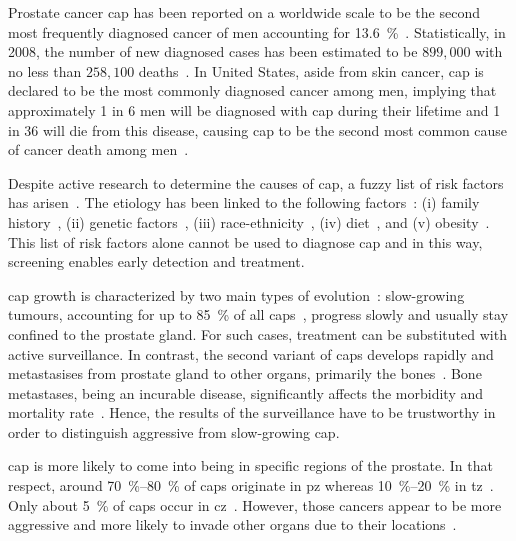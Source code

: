 Prostate cancer \ac{cap} has been reported on a worldwide scale to be the
second most frequently diagnosed cancer of men accounting for
\SI{13.6}{\percent}~\cite{Ferlay2010}.
Statistically, in 2008, the number of new diagnosed cases has been estimated to
be $899,000$ with no less than $258,100$ deaths~\cite{Ferlay2010}.
In United States, aside from skin cancer, \ac{cap} is declared to be the most
commonly diagnosed cancer among men, implying that approximately 1 in 6 men
will be diagnosed with \ac{cap} during their lifetime and 1 in 36 will die from
this disease, causing \ac{cap} to be the second most common cause of cancer
death among men~\cite{Siegel2013,Society2013}.

Despite active research to determine the causes of \ac{cap}, a fuzzy list of
risk factors has arisen~\cite{Society2010}.
The etiology has been linked to the following factors~\cite{Society2010}: (i)
family history~\cite{Giovannucci2007,Steinberg1990}, (ii) genetic
factors~\cite{Freedman2006,Amundadottir2006,Agalliu2009}, (iii)
race-ethnicity~\cite{Giovannucci2007,Hoffman2001}, (iv)
diet~\cite{Giovannucci2007,Ma2009,Alexander2010}, and (v)
obesity~\cite{Giovannucci2007,Rodriguez2007}.
This list of risk factors alone cannot be used to diagnose \ac{cap} and in this
way, screening enables early detection and treatment.

\ac{cap} growth is characterized by two main types of
evolution~\cite{Strum2005}: slow-growing tumours, accounting for up to
\SI{85}{\percent} of all \acp{cap}~\cite{Lu-Yao2009}, progress slowly and
usually stay confined to the prostate gland.
For such cases, treatment can be substituted with active surveillance.
In contrast, the second variant of \acp{cap} develops rapidly and metastasises
from prostate gland to other organs, primarily the bones~\cite{Oster2013}.
Bone metastases, being an incurable disease, significantly affects the
morbidity and mortality rate~\cite{Ye2007}.
Hence, the results of the surveillance have to be trustworthy in order to
distinguish aggressive from slow-growing \ac{cap}.

\ac{cap} is more likely to come into being in specific regions of the prostate.
In that respect, around \SIrange{70}{80}{\percent} of \acp{cap} originate in
\ac{pz} whereas \SIrange{10}{20}{\percent} in
\ac{tz}~\cite{Carrol1987,McNeal1988,Stamey1998}.
Only about \SI{5}{\percent} of \acp{cap} occur in
\ac{cz}~\cite{McNeal1988,Cohen2008}.
However, those cancers appear to be more aggressive and more likely to invade
other organs due to their locations~\cite{Cohen2008}.
